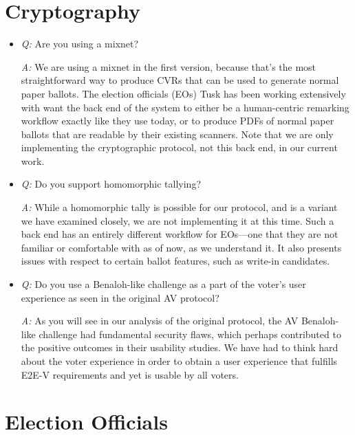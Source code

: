\documentclass[12pt,letter]{article}
\begin{document}
\section{Cryptography}

\begin{itemize}

    \item \emph{Q:} Are you using a mixnet?

    \emph{A:} We are using a mixnet in the first version, because that's the most straightforward way to produce CVRs that can be used to generate normal paper ballots. The election officials (EOs) Tusk has been working extensively with want the back end of the system to either be a human-centric remarking workflow exactly like they use today, or to produce PDFs of normal paper ballots that are readable by their existing scanners.  Note that we are only implementing the cryptographic protocol, not this back end, in our current work.

    \item \emph{Q:} Do you support homomorphic tallying?

    \emph{A:} While a homomorphic tally is possible for our protocol, and is a variant we have examined closely, we are not implementing it at this time.  Such a back end has an entirely different workflow for EOs---one that they are not familiar or comfortable with as of now, as we understand it. It also presents issues with respect to certain ballot features, such as write-in candidates.

    \item \emph{Q:} Do you use a Benaloh-like challenge as a part of the voter's user experience as seen in the original AV protocol?

    \emph{A:} As you will see in our analysis of the original protocol, the AV Benaloh-like challenge had fundamental security flaws, which perhaps contributed to the positive outcomes in their usability studies.  We have had to think hard about the voter experience in order to obtain a user experience that fulfills E2E-V requirements and yet is usable by all voters.

\end{itemize}

\section{Election Officials}
\end{document}
